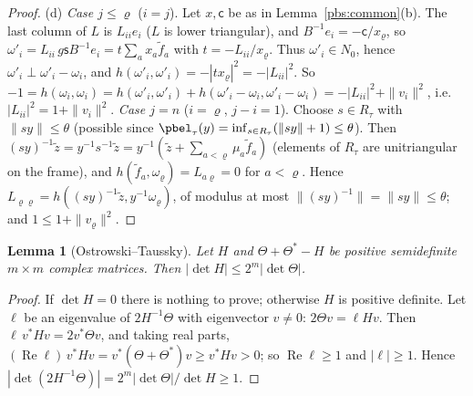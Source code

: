 \documentclass[10pt]{amsart}
\newtheorem{lemma}[theorem]{Lemma}
\theoremstyle{definition}
\theoremstyle{remark}
\begin{document}
\begin{proof}
(d) \emph{Case $j\le\varrho$} ($i=j$). Let $x,\mathsf c$ be as in Lemma~\ref{pbs:common}(b). The last
column of $L$ is $L_{ii}e_i$ ($L$ is lower triangular), and $B^{-1}e_i=-\mathsf c/x_\varrho$, so $\omega'_i=
L_{ii}\,g\mathsf sB^{-1}e_i=t\sum_ax_a\tilde f_a$ with $t=-L_{ii}/x_\varrho$. Thus $\omega'_i\in N_0$,
hence $\omega'_i\perp\omega'_i-\omega_i$, and $h(\omega'_i,\omega'_i)=-|tx_\varrho|^2=-|L_{ii}|^2$. So
$-1=h(\omega_i,\omega_i)=h(\omega'_i,\omega'_i)+h(\omega'_i-\omega_i,\omega'_i-\omega_i)=-|L_{ii}|^2+\|v_i
\|^2$, i.e.\ $|L_{ii}|^2=1+\|v_i\|^2$. \emph{Case $j=n$} ($i=\varrho$, $j-i=1$). Choose $s\in R_\tau$
with $\|sy\|\le\theta$ (possible since $\pbel_\tau(y)=\inf_{s\in R_\tau}(\|sy\|+1)\le\theta$). Then $(sy)^{-1}\tilde z=y^{-1}s^{-1}\tilde z=y^{-1}(\tilde z+\sum_{a<\varrho}
\mu_a\tilde f_a)$ (elements of $R_\tau$ are unitriangular on the frame), and $h(\tilde f_a,\omega_\varrho)
=L_{a\varrho}=0$ for $a<\varrho$. Hence $L_{\varrho\varrho}=h((sy)^{-1}\tilde z,y^{-1}\omega_\varrho)$, of
modulus at most $\|(sy)^{-1}\|=\|sy\|\le\theta$; and $1\le1+\|v_\varrho\|^2$.
\end{proof}

\begin{lemma}[Ostrowski--Taussky]\label{pbs:OT}
Let $H$ and $\Theta+\Theta^*-H$ be positive semidefinite $m\times m$ complex matrices. Then $|\det H|\le
2^m|\det\Theta|$.
\end{lemma}
\begin{proof}
If $\det H=0$ there is nothing to prove; otherwise $H$ is positive definite. Let $\ell$ be an
eigenvalue of $2H^{-1}\Theta$ with eigenvector $v\ne0$: $2\Theta v=\ell Hv$. Then $\ell\,v^*Hv=2v^*\Theta
v$, and taking real parts, $(\operatorname{Re}\ell)\,v^*Hv=v^*(\Theta+\Theta^*)v\ge v^*Hv>0$; so
$\operatorname{Re}\ell\ge1$ and $|\ell|\ge1$. Hence $|\det(2H^{-1}\Theta)|=2^m|\det\Theta|/\det H\ge1$.
\end{proof}
\end{document}
